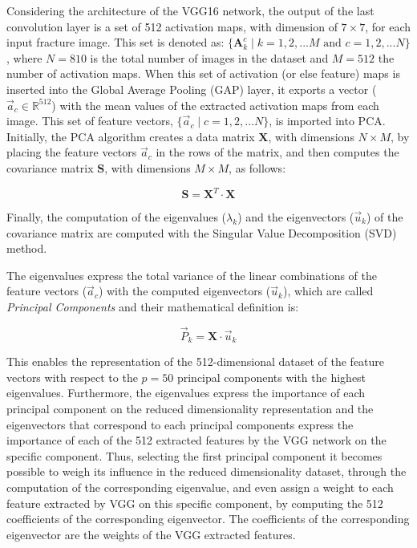 \documentclass[authoryear,preprint,review,12pt, singleside]{elsarticle}
\begin{document}
Considering the architecture of the VGG16 network, the output of the last convolution layer is a set of 512 activation maps, with dimension of $7 \times 7$, for each input fracture image. This set is  denoted as: $\{\textbf{A}_k^c \; | \; k=1,2, ... M \text{ and } c=1,2, ... N\}$, where $N=810$ is the total number of images in the dataset and $M=512$ the number of activation maps. When this set of activation (or else feature) maps is inserted into the Global Average Pooling (GAP) layer, it exports a vector ($\vec{a}_c \in \mathbb{R}^{512}$) with the mean values of the extracted activation maps from each image. This set of feature vectors, $\{\vec{a}_c \; | \; c=1,2, ... N\}$, is imported into PCA. Initially, the PCA algorithm creates a data matrix $\textbf{X}$, with dimensions $N \times M$, by placing the feature vectors $\vec{a}_c$ in the rows of the matrix, and then computes the covariance matrix $\textbf{S}$, with dimensions $M \times M$, as follows: 

\begin{equation*}
\textbf{S} = \textbf{X}^T \cdot \textbf{X}
\end{equation*}

Finally, the computation of the eigenvalues ($\lambda_k$) and the eigenvectors ($\vec{u}_k$) of the covariance matrix are computed with the Singular Value Decomposition (SVD) method. 

The eigenvalues express the total variance of the linear combinations of the feature vectors ($\vec{a}_c$) with the computed eigenvectors ($\vec{u}_k$), which are called \textit{Principal Components} and their mathematical definition is:

\begin{equation*}
\vec{P}_k = \textbf{X} \cdot \vec{u}_k
\end{equation*}

This enables the representation of the 512-dimensional dataset of the feature vectors with respect to the $p=50$ principal components with the highest eigenvalues. Furthermore, the eigenvalues express the importance of each principal component on the reduced dimensionality representation and the eigenvectors that correspond to each principal components express the importance of each of the 512 extracted features by the VGG network on the specific component. Thus, selecting the first principal component it becomes possible to weigh its influence in the reduced dimensionality dataset, through the computation of the corresponding eigenvalue, and even assign a weight to each feature extracted by VGG on this specific component, by computing the 512 coefficients of the corresponding eigenvector. The coefficients of the corresponding eigenvector are the weights of the VGG extracted features.
\end{document}
